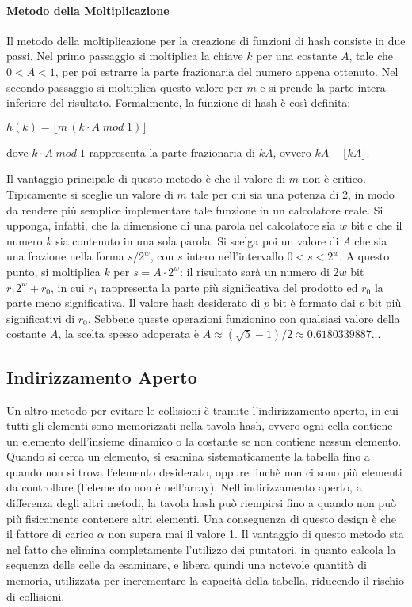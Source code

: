 \paragraph{Metodo della Moltiplicazione} Il metodo della moltiplicazione per la creazione di funzioni di hash consiste in due passi. Nel primo passaggio si moltiplica la chiave \(k\) per una costante \(A\), tale che \(0<A<1\), per poi estrarre la parte frazionaria del numero appena ottenuto. Nel secondo passaggio si moltiplica questo valore per \(m\) e si prende la parte intera inferiore del risultato. Formalmente, la funzione di hash è così definita:

\(h(k) = \lfloor m\,(k\cdot A\;mod\;1)\rfloor\)

\noindent dove \(k\cdot A \; mod \;1 \) rappresenta la parte frazionaria di \(kA\), ovvero \(kA-\lfloor kA\rfloor\). 

Il vantaggio principale di questo metodo è che il valore di \(m\) non è critico. Tipicamente si sceglie un valore di \(m\) tale per cui sia una potenza di 2, in modo da rendere più semplice implementare tale funzione in un calcolatore reale. Si upponga, infatti, che la dimensione di una parola nel calcolatore sia \(w\) bit e che il numero \(k\) sia contenuto in una sola parola. Si scelga poi un valore di \(A\) che sia una frazione nella forma \(s/2^w\), con \(s\) intero nell'intervallo \(0<s<2^w\). A questo punto, si moltiplica \(k\) per \(s=A\cdot 2^w\): il risultato sarà un numero di \(2w\) bit \(r_1 2^w+r_0\), in cui \(r_1\) rappresenta la parte più significativa del prodotto ed \(r_0\) la parte meno significativa. Il valore hash desiderato di \(p\) bit è formato dai \(p\) bit più significativi di \(r_0\). Sebbene queste operazioni funzionino con qualsiasi valore della costante \(A\), la scelta spesso adoperata è \(A \approx (\sqrt{5}-1)/2 \approx 0.6180339887...\)

\subsection{Indirizzamento Aperto}
Un altro metodo per evitare le collisioni è tramite l'indirizzamento aperto, in cui tutti gli elementi sono memorizzati nella tavola hash, ovvero ogni cella contiene un elemento dell'insieme dinamico o la costante  se non contiene nessun elemento. Quando si cerca un elemento, si esamina sistematicamente la tabella fino a quando non si trova l'elemento desiderato, oppure finchè non ci sono più elementi da controllare (l'elemento non è nell'array). Nell'indirizzamento aperto, a differenza degli altri metodi, la tavola hash può riempirsi fino a quando non può più fisicamente contenere altri elementi. Una conseguenza di questo design è che il fattore di carico \(\alpha\) non supera mai il valore 1. Il vantaggio di questo metodo sta nel fatto che elimina completamente l'utilizzo dei puntatori, in quanto calcola la sequenza delle celle da esaminare, e libera quindi una notevole quantità di memoria, utilizzata per incrementare la capacità della tabella, riducendo il rischio di collisioni. 

